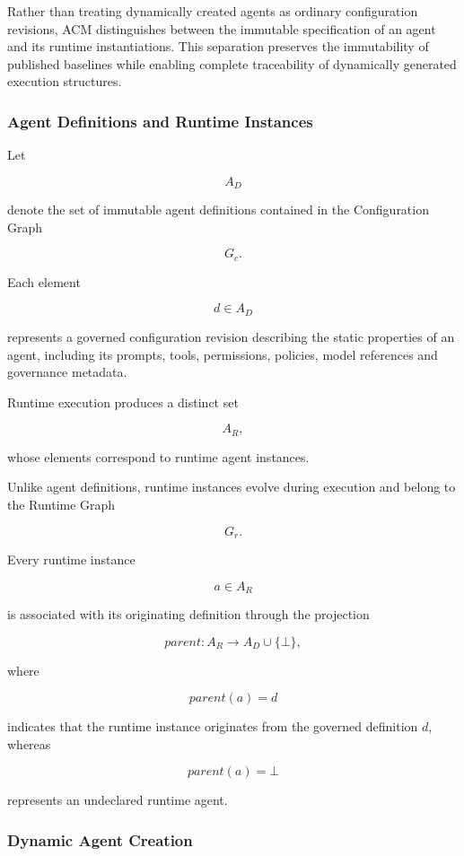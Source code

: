 \documentclass[10pt]{article}
\begin{document}
Rather than treating dynamically created agents as ordinary configuration
revisions, ACM distinguishes between the immutable specification of an agent
and its runtime instantiations. This separation preserves the immutability of
published baselines while enabling complete traceability of dynamically
generated execution structures.

\subsubsection{Agent Definitions and Runtime Instances}

Let

\[
A_D
\]

denote the set of immutable agent definitions contained in the Configuration
Graph

\[
G_c.
\]

Each element

\[
d\in A_D
\]

represents a governed configuration revision describing the static properties
of an agent, including its prompts, tools, permissions, policies, model
references and governance metadata.

Runtime execution produces a distinct set

\[
A_R,
\tag{31}
\]

whose elements correspond to runtime agent instances.

Unlike agent definitions, runtime instances evolve during execution and belong
to the Runtime Graph

\[
G_r.
\]

Every runtime instance

\[
a\in A_R
\]

is associated with its originating definition through the projection

\[
parent :
A_R
\rightarrow
A_D
\cup
\{\bot\},
\tag{32}
\]

where

\[
parent(a)=d
\]

indicates that the runtime instance originates from the governed definition
$d$, whereas

\[
parent(a)=\bot
\]

represents an undeclared runtime agent.

\subsubsection{Dynamic Agent Creation}
\end{document}
